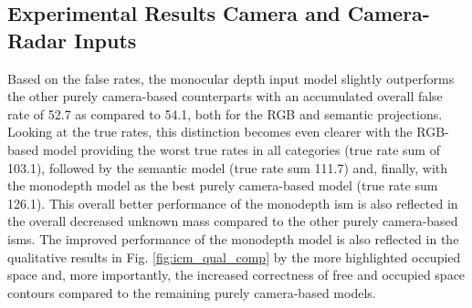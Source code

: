 \subsection{Experimental Results Camera and Camera-Radar Inputs}
\label{subsec:exp_cam_fusion_in_deep_isms}
Based on the false rates, the monocular depth input model slightly outperforms the other purely camera-based counterparts with an accumulated overall false rate of 52.7 as compared to 54.1, both for the RGB and semantic projections. Looking at the true rates, this distinction becomes even clearer with the RGB-based model providing the worst true rates in all categories (true rate sum of 103.1), followed by the semantic model (true rate sum 111.7) and, finally, with the \gls{monodepth} model as the best purely camera-based model (true rate sum 126.1). This overall better performance of the \gls{monodepth} \gls{ism} is also reflected in the overall decreased unknown mass compared to the other purely camera-based \gls{ism}s. The improved performance of the \gls{monodepth} model is also reflected in the qualitative results in Fig. \ref{fig:icm_qual_comp} by the more highlighted occupied space and, more importantly, the increased correctness of free and occupied space contours compared to the remaining purely camera-based models.
